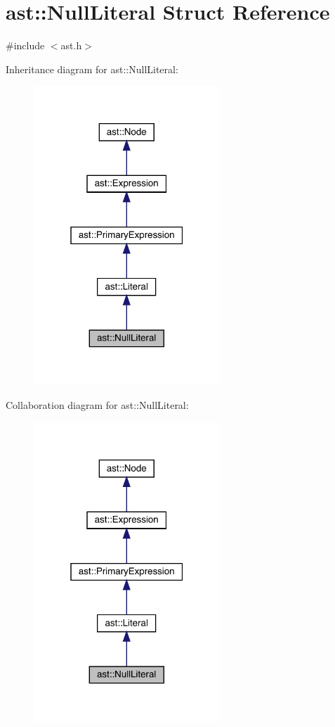 \hypertarget{structast_1_1_null_literal}{}\section{ast\+:\+:Null\+Literal Struct Reference}
\label{structast_1_1_null_literal}


{\ttfamily \#include $<$ast.\+h$>$}



Inheritance diagram for ast\+:\+:Null\+Literal\+:\nopagebreak
\begin{figure}[H]
\begin{center}
\leavevmode
\includegraphics[width=199pt]{structast_1_1_null_literal__inherit__graph}
\end{center}
\end{figure}


Collaboration diagram for ast\+:\+:Null\+Literal\+:\nopagebreak
\begin{figure}[H]
\begin{center}
\leavevmode
\includegraphics[width=199pt]{structast_1_1_null_literal__coll__graph}
\end{center}
\end{figure}
